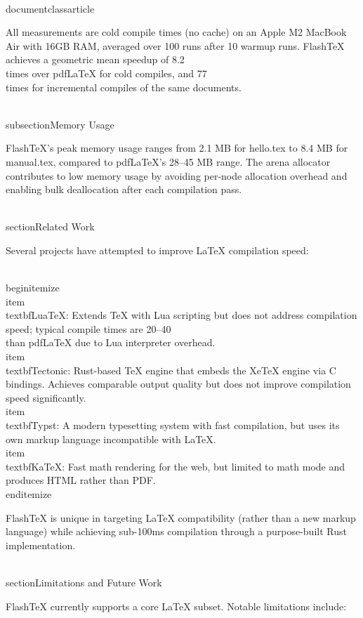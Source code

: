 \\documentclass{article}
\begin{document}
All measurements are cold compile times (no cache) on an Apple M2 MacBook
Air with 16GB RAM, averaged over 100 runs after 10 warmup runs. FlashTeX
achieves a geometric mean speedup of 8.2\\times over pdfLaTeX for cold
compiles, and 77\\times for incremental compiles of the same documents.

\\subsection{Memory Usage}

FlashTeX's peak memory usage ranges from 2.1 MB for hello.tex to 8.4 MB
for manual.tex, compared to pdfLaTeX's 28--45 MB range. The arena
allocator contributes to low memory usage by avoiding per-node allocation
overhead and enabling bulk deallocation after each compilation pass.

\\section{Related Work}

Several projects have attempted to improve LaTeX compilation speed:

\\begin{itemize}
  \\item \\textbf{LuaTeX}: Extends TeX with Lua scripting but does not
    address compilation speed; typical compile times are 20--40\\%
    than pdfLaTeX due to Lua interpreter overhead.
  \\item \\textbf{Tectonic}: Rust-based TeX engine that embeds the
    XeTeX engine via C bindings. Achieves comparable output quality but
    does not improve compilation speed significantly.
  \\item \\textbf{Typst}: A modern typesetting system with fast
    compilation, but uses its own markup language incompatible with LaTeX.
  \\item \\textbf{KaTeX}: Fast math rendering for the web, but limited
    to math mode and produces HTML rather than PDF.
\\end{itemize}

FlashTeX is unique in targeting LaTeX compatibility (rather than a new
markup language) while achieving sub-100ms compilation through a
purpose-built Rust implementation.

\\section{Limitations and Future Work}

FlashTeX currently supports a core LaTeX subset. Notable limitations
include:
\end{document}
